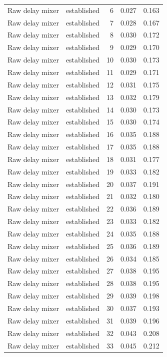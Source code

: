 \begin{tabular}{llrrr}
Raw delay mixer & established & 6 & 0.027 & 0.163 \\
Raw delay mixer & established & 7 & 0.028 & 0.167 \\
Raw delay mixer & established & 8 & 0.030 & 0.172 \\
Raw delay mixer & established & 9 & 0.029 & 0.170 \\
Raw delay mixer & established & 10 & 0.030 & 0.173 \\
Raw delay mixer & established & 11 & 0.029 & 0.171 \\
Raw delay mixer & established & 12 & 0.031 & 0.175 \\
Raw delay mixer & established & 13 & 0.032 & 0.179 \\
Raw delay mixer & established & 14 & 0.030 & 0.173 \\
Raw delay mixer & established & 15 & 0.030 & 0.174 \\
Raw delay mixer & established & 16 & 0.035 & 0.188 \\
Raw delay mixer & established & 17 & 0.035 & 0.188 \\
Raw delay mixer & established & 18 & 0.031 & 0.177 \\
Raw delay mixer & established & 19 & 0.033 & 0.182 \\
Raw delay mixer & established & 20 & 0.037 & 0.191 \\
Raw delay mixer & established & 21 & 0.032 & 0.180 \\
Raw delay mixer & established & 22 & 0.036 & 0.189 \\
Raw delay mixer & established & 23 & 0.033 & 0.182 \\
Raw delay mixer & established & 24 & 0.035 & 0.188 \\
Raw delay mixer & established & 25 & 0.036 & 0.189 \\
Raw delay mixer & established & 26 & 0.034 & 0.185 \\
Raw delay mixer & established & 27 & 0.038 & 0.195 \\
Raw delay mixer & established & 28 & 0.038 & 0.195 \\
Raw delay mixer & established & 29 & 0.039 & 0.198 \\
Raw delay mixer & established & 30 & 0.037 & 0.193 \\
Raw delay mixer & established & 31 & 0.039 & 0.196 \\
Raw delay mixer & established & 32 & 0.043 & 0.208 \\
Raw delay mixer & established & 33 & 0.045 & 0.212 \\

\end{tabular}
